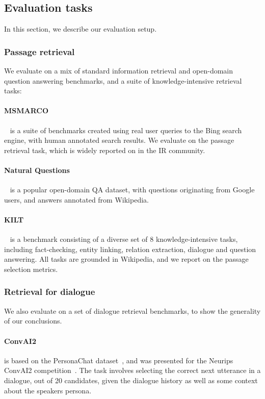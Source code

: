 \documentclass[11pt]{article}
\begin{document}
\subsection{Evaluation tasks}
In this section, we describe our evaluation setup.
\subsubsection{Passage retrieval}
We evaluate on a mix of standard information retrieval and open-domain question answering benchmarks, and a suite of knowledge-intensive retrieval tasks:
\paragraph{MSMARCO}~\citep{nguyen2016ms} is a suite of benchmarks created using real user queries to the Bing search engine, with human annotated search results.  We evaluate on the passage retrieval task, which is widely reported on in the IR community.
\paragraph{Natural Questions}~\citep[NQ,][]{nq} is a popular open-domain QA dataset, with questions originating from Google users, and answers annotated from Wikipedia.
\paragraph{KILT}~\citep{petroni2020kilt} is a benchmark consisting of a diverse set of 8 knowledge-intensive tasks, including fact-checking, entity linking, relation extraction, dialogue and question answering.  All tasks are grounded in Wikipedia, and we report on the passage selection metrics.

\subsubsection{Retrieval for dialogue}
We also evaluate on a set of dialogue retrieval benchmarks, to show the generality of our conclusions.
\paragraph{ConvAI2} is based on the PersonaChat dataset~\citep{zhang2018personalizing}, and was presented for the Neurips ConvAI2 competition~\citep{dinan2019second}. The task involves selecting the correct next utterance in a dialogue, out of 20 candidates, given the dialogue history as well as some context about the speakers persona.
\end{document}
